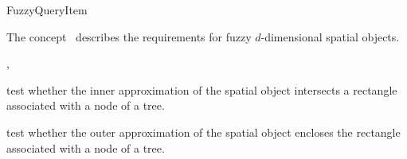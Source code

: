 

\begin{ccRefConcept}{FuzzyQueryItem}


\ccDefinition
  
The concept \ccRefName\ describes the requirements for fuzzy $d$-dimensional spatial objects.

\ccHasModels

,\\

\ccTypes





\ccOperations


{test whether the inner approximation of the spatial object intersects a rectangle
associated with a node of a tree. }

{test whether the outer approximation of the spatial object encloses the rectangle
associated with a node of a tree.}





\end{ccRefConcept}



